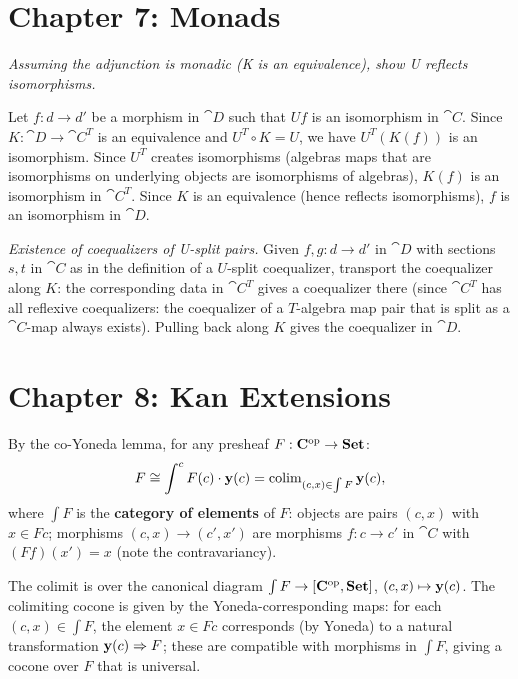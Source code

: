 \section*{Chapter 7: Monads}

\begin{exercise}
\textit{Assuming the adjunction is monadic (K is an equivalence), show U reflects isomorphisms.}

Let $f: d \to d'$ be a morphism in $\cat{D}$ such that $Uf$ is an isomorphism in $\cat{C}$. Since $K: \cat{D} \to \cat{C}^T$ is an equivalence and $U^T \circ K = U$, we have $U^T(K(f))$ is an isomorphism. Since $U^T$ creates isomorphisms (algebras maps that are isomorphisms on underlying objects are isomorphisms of algebras), $K(f)$ is an isomorphism in $\cat{C}^T$. Since $K$ is an equivalence (hence reflects isomorphisms), $f$ is an isomorphism in $\cat{D}$.

\textit{Existence of coequalizers of U-split pairs.} Given $f, g: d \to d'$ in $\cat{D}$ with sections $s, t$ in $\cat{C}$ as in the definition of a $U$-split coequalizer, transport the coequalizer along $K$: the corresponding data in $\cat{C}^T$ gives a coequalizer there (since $\cat{C}^T$ has all reflexive coequalizers: the coequalizer of a $T$-algebra map pair that is split as a $\cat{C}$-map always exists). Pulling back along $K$ gives the coequalizer in $\cat{D}$.
\end{exercise}

\section*{Chapter 8: Kan Extensions}

\begin{exercise}
By the co-Yoneda lemma, for any presheaf $F: \mathbf{C}^{\mathrm{op}} \to \mathbf{Set}$:
\[
  F \cong \int^c F(c) \cdot \mathbf{y}(c) = \operatorname{colim}_{(c, x) \in \int F} \mathbf{y}(c),
\]
where $\int F$ is the \textbf{category of elements} of $F$: objects are pairs $(c, x)$ with $x \in Fc$; morphisms $(c,x) \to (c',x')$ are morphisms $f: c \to c'$ in $\cat{C}$ with $(Ff)(x') = x$ (note the contravariancy).

The colimit is over the canonical diagram $\int F \to [\mathbf{C}^{\mathrm{op}},\mathbf{Set}]$, $(c,x) \mapsto \mathbf{y}(c)$. The colimiting cocone is given by the Yoneda-corresponding maps: for each $(c,x) \in \int F$, the element $x \in Fc$ corresponds (by Yoneda) to a natural transformation $\mathbf{y}(c) \Rightarrow F$; these are compatible with morphisms in $\int F$, giving a cocone over $F$ that is universal.
\end{exercise}


